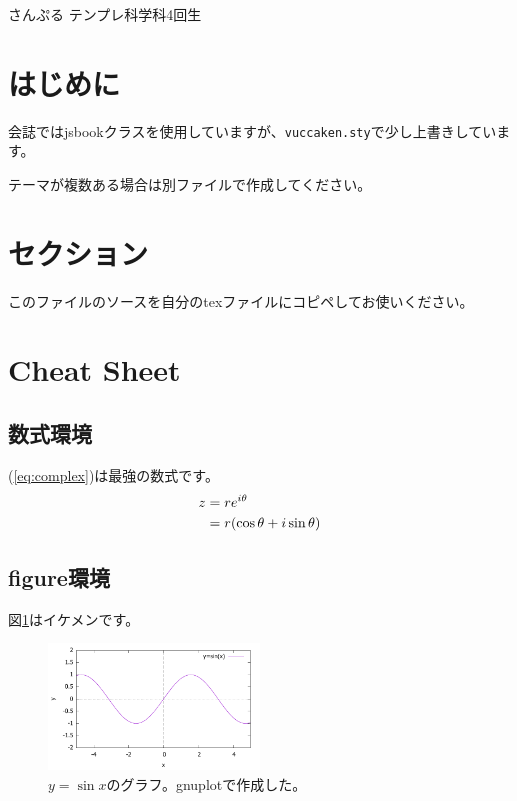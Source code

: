 \documentclass[uplatex,dvipdfmx,10pt,b5paper,papersize]{jsbook}
\begin{document}


\kaishititle%
  {さんぷる}%
  {テンプレ科学科4回生}%
  {}%

\helloLaTeX

%
\section*{はじめに}
会誌ではjsbookクラスを使用していますが、\texttt{vuccaken.sty}で少し上書きしています。\par
テーマが複数ある場合は別ファイルで作成してください。

%
\section{セクション}
このファイルのソースを自分のtexファイルにコピペしてお使いください。

%
\section{Cheat Sheet}

\subsection{数式環境}
(\ref{eq:complex})は最強の数式です。
\begin{align}
  z &= r e^{i\theta} \notag \\
    &= r (\cos\theta + i\sin\theta) \label{eq:complex}
\end{align}

\subsection{figure環境}
図\ref{fig:sin}はイケメンです。
\begin{figure}[htbp]
  \centering
  \includegraphics[width=0.5\textwidth]{img/fig-sin.pdf}
  \caption{$y=\sin x$のグラフ。gnuplotで作成した。}
  \label{fig:sin}
\end{figure}
\end{document}
